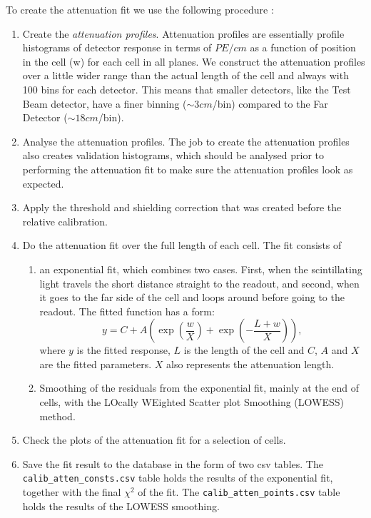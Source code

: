 \documentclass[12pt,a4paper]{article}
\begin{document}
To create the attenuation fit we use the following procedure \cite{NOVA-doc-7410}:
\begin{enumerate}
\item Create the \textit{attenuation profiles}. Attenuation profiles are essentially profile histograms of detector response in terms of $\unit{PE/cm}$ as a function of position in the cell (w) for each cell in all planes. We construct the attenuation profiles over a little wider range than the actual length of the cell and always with 100 bins for each detector. This means that smaller detectors, like the Test Beam detector, have a finer binning ($\sim 3\unit{cm}$/bin) compared to the Far Detector ($\sim 18\unit{cm}$/bin).
\item Analyse the attenuation profiles. The job to create the attenuation profiles also creates validation histograms, which should be analysed prior to performing the attenuation fit to make sure the attenuation profiles look as expected.
\item Apply the threshold and shielding correction that was created before the relative calibration.
\item Do the attenuation fit over the full length of each cell. The fit consists of
\begin{enumerate}
\item an exponential fit, which combines two cases. First, when the scintillating light travels the short distance straight to the readout, and second, when it goes to the far side of the cell and loops around before going to the readout. The fitted function has a form:\\
\begin{equation}
y=C+A\left(\exp\left(\frac{w}{X}\right)+\exp\left(-\frac{L+w}{X}\right)\right),
\end{equation}
where $y$ is the fitted response, $L$ is the length of the cell and $C$, $A$ and $X$ are the fitted parameters. $X$ also represents the attenuation length.
\item Smoothing of the residuals from the exponential fit, mainly at the end of cells, with the LOcally WEighted Scatter plot Smoothing (LOWESS) method.
\end{enumerate}
\item Check the plots of the attenuation fit for a selection of cells.
\item Save the fit result to the database in the form of two csv tables. The \texttt{calib\_atten\_consts.csv} table holds the results of the exponential fit, together with the final $\chi^2$ of the fit. The \texttt{calib\_atten\_points.csv} table holds the results of the LOWESS smoothing.
\end{enumerate}
\end{document}
